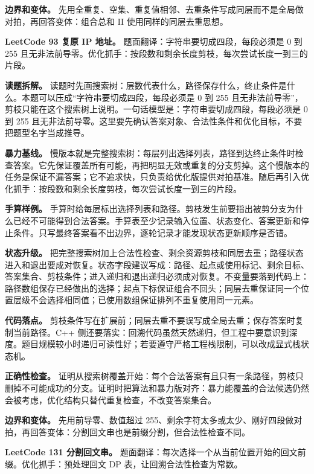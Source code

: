 \textbf{边界和变体。} 先用全重复、空集、重复值相邻、去重条件写成同层而不是全局做对拍，再回答变体：组合总和 II 使用同样的同层去重思想。

\noindent\textbf{LeetCode 93 复原 IP 地址。} 题面翻译：字符串要切成四段，每段必须是 0 到 255 且无非法前导零。优化抓手：按段数和剩余长度剪枝，每次尝试长度一到三的片段。

\textbf{读题拆解。} 读题时先画搜索树：层数代表什么，路径保存什么，终止条件是什么。本题可以压成“字符串要切成四段，每段必须是 0 到 255 且无非法前导零”，剪枝只能在这个搜索树上说明。一句话模型是：字符串要切成四段，每段必须是 0 到 255 且无非法前导零。这里要先确认答案对象、合法性条件和优化目标，不要把题型名字当成推导。

\textbf{暴力基线。} 慢版本就是完整搜索树：每层列出选择列表，路径到达终止条件时检查答案。它先保证覆盖所有可能，再把明显无效或重复的分支剪掉。这个慢版本的任务是保证不漏答案；它不追求快，只负责给优化版提供对拍基准。随后再引入优化抓手：按段数和剩余长度剪枝，每次尝试长度一到三的片段。

\textbf{手算样例。} 手算时给每层标出选择列表和路径。剪枝发生前要指出被剪分支为什么已经不可能得到合法答案。手算表至少记录输入位置、状态变化、答案更新和停止条件。只写最终答案看不出边界，逐轮记录才能发现状态更新顺序是否错。

\textbf{状态升级。} 把完整搜索树加上合法性检查、剩余资源剪枝和同层去重；路径状态进入和退出要成对恢复。状态字段建议写成：路径、起点或使用标记、剩余目标、答案集合、剪枝条件；进入递归和退出递归必须成对恢复。不变量要落到代码上：路径数组保存已经做出的选择；起点下标保证组合不回头；同层去重保证同一个位置层级不会选择相同值；已使用数组保证排列不重复使用同一元素。

\textbf{代码落点。} 剪枝条件写在扩展前；同层去重不要误写成全局去重；保存答案时复制当前路径。C++ 侧还要落实：回溯代码虽然天然递归，但工程中要意识到深度。题目规模较小时递归可读性好；若要遵守严格工程栈限制，可以改成显式栈状态机。

\textbf{正确性检查。} 证明从搜索树覆盖开始：每个合法答案有且只有一条路径，剪枝只删掉不可能成功的分支。证明时把算法和暴力版对齐：暴力能覆盖的合法候选仍然会被考虑，优化结构只替代重复检查，不改变答案集合。

\textbf{边界和变体。} 先用前导零、数值超过 255、剩余字符太多或太少、刚好四段做对拍，再回答变体：分割回文串也是前缀分割，但合法性检查不同。

\noindent\textbf{LeetCode 131 分割回文串。} 题面翻译：每次选择一个从当前位置开始的回文前缀。优化抓手：预处理回文 DP 表，让回溯合法性检查为常数。

